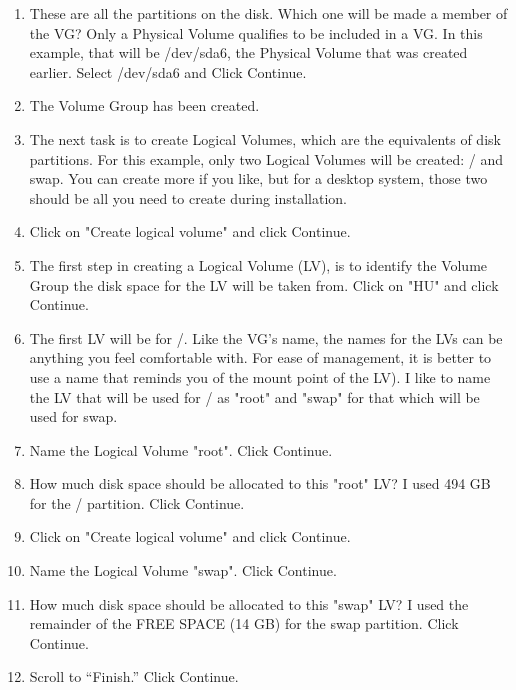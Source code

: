 \documentclass[12pt,notitlepage,onecolumn,oneside,openany]{memoir}
\begin{document}
\begin{enumerate}
\item \textsf{These are all the partitions on the disk. Which one will be made a member of the VG? Only a Physical Volume qualifies to be included in a VG. In this example, that will be /dev/sda6, the Physical Volume that was created earlier. Select /dev/sda6 and Click Continue.}
 
\item \textsf{The Volume Group has been created.} 

\item \textsf{The next task is to create Logical Volumes, which are the equivalents of disk partitions. For this example, only two Logical Volumes will be created: / and swap. You can create more if you like, but for a desktop system, those two should be all you need to create during installation.} 

\item \textsf{Click on "Create logical volume" and click Continue.}
 
\item \textsf{The first step in creating a Logical Volume (LV), is to identify the Volume Group the disk space for the LV will be taken from. Click on "HU" and click Continue.} 

\item \textsf{The first LV will be for /. Like the VG’s name, the names for the LVs can be anything you feel comfortable with. For ease of management, it is better to use a name that reminds you of the mount point of the LV). I like to name the LV that will be used for / as "root" and "swap" for that which will be used for swap.} 

\item \textsf{Name the Logical Volume "root". Click Continue.} 

\item \textsf{How much disk space should be allocated to this "root" LV? I used 494 GB for the / partition. Click Continue.} 

\item \textsf{Click on "Create logical volume" and click Continue.}
 
\item \textsf{Name the Logical Volume "swap". Click Continue.} 

\item \textsf{How much disk space should be allocated to this "swap" LV? I used the remainder of the FREE SPACE (14 GB) for the swap partition. Click Continue.} 

\item \textsf{Scroll to “Finish.” Click Continue.} 


\end{enumerate}
\end{document}
